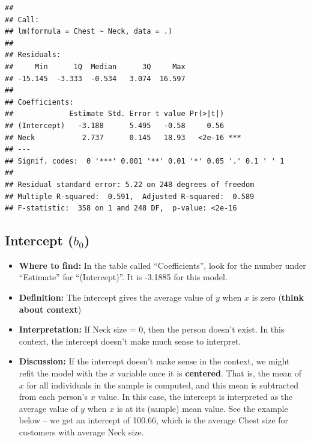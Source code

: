 \documentclass[]{book}
\newenvironment{Shaded}{\begin{snugshade}}{\end{snugshade}}
\newcommand{\DataTypeTok}[1]{\textcolor[rgb]{0.13,0.29,0.53}{#1}}
\newcommand{\KeywordTok}[1]{\textcolor[rgb]{0.13,0.29,0.53}{\textbf{#1}}}
\newcommand{\NormalTok}[1]{#1}
\newcommand{\OperatorTok}[1]{\textcolor[rgb]{0.81,0.36,0.00}{\textbf{#1}}}
\newcommand{\StringTok}[1]{\textcolor[rgb]{0.31,0.60,0.02}{#1}}
\providecommand{\tightlist}{%
  \setlength{\itemsep}{0pt}\setlength{\parskip}{0pt}}
\begin{document}
\begin{Shaded}
\end{Shaded}

\begin{verbatim}
## 
## Call:
## lm(formula = Chest ~ Neck, data = .)
## 
## Residuals:
##     Min      1Q  Median      3Q     Max 
## -15.145  -3.333  -0.534   3.074  16.597 
## 
## Coefficients:
##             Estimate Std. Error t value Pr(>|t|)    
## (Intercept)   -3.188      5.495   -0.58     0.56    
## Neck           2.737      0.145   18.93   <2e-16 ***
## ---
## Signif. codes:  0 '***' 0.001 '**' 0.01 '*' 0.05 '.' 0.1 ' ' 1
## 
## Residual standard error: 5.22 on 248 degrees of freedom
## Multiple R-squared:  0.591,  Adjusted R-squared:  0.589 
## F-statistic:  358 on 1 and 248 DF,  p-value: <2e-16
\end{verbatim}

\hypertarget{intercept-b_0}{%
\subsection{\texorpdfstring{Intercept (\(b_0\))}{Intercept (b\_0)}}\label{intercept-b_0}}

\begin{itemize}
\tightlist
\item
  \textbf{Where to find:} In the table called ``Coefficients'', look for the number under ``Estimate'' for ``(Intercept)''. It is -3.1885 for this model.
\item
  \textbf{Definition:} The intercept gives the average value of \(y\) when \(x\) is zero (\textbf{think about context})
\item
  \textbf{Interpretation:} If Neck size = 0, then the person doesn't exist. In this context, the intercept doesn't make much sense to interpret.
\item
  \textbf{Discussion:} If the intercept doesn't make sense in the context, we might refit the model with the \(x\) variable once it is \textbf{centered}. That is, the mean of \(x\) for all individuals in the sample is computed, and this mean is subtracted from each person's \(x\) value. In this case, the intercept is interpreted as the average value of \(y\) when \(x\) is at its (sample) mean value. See the example below -- we get an intercept of 100.66, which is the average Chest size for customers with average Neck size.
\end{itemize}
\end{document}
